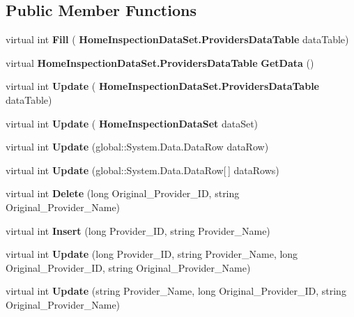 \subsection*{Public Member Functions}
\begin{DoxyCompactItemize}
\item 
\mbox{\label{class_a_f_h___scheduler_1_1_home_inspection_data_set_table_adapters_1_1_providers_table_adapter_a92208d2347cf62d525bd9ffa95bc9fef}} 
virtual int {\bfseries Fill} (\textbf{ Home\+Inspection\+Data\+Set.\+Providers\+Data\+Table} data\+Table)
\item 
\mbox{\label{class_a_f_h___scheduler_1_1_home_inspection_data_set_table_adapters_1_1_providers_table_adapter_a80451c14243a921bb45ecad94e3ed131}} 
virtual \textbf{ Home\+Inspection\+Data\+Set.\+Providers\+Data\+Table} {\bfseries Get\+Data} ()
\item 
\mbox{\label{class_a_f_h___scheduler_1_1_home_inspection_data_set_table_adapters_1_1_providers_table_adapter_a5c0a17c73d0325840a2fe51e9cb7bcc0}} 
virtual int {\bfseries Update} (\textbf{ Home\+Inspection\+Data\+Set.\+Providers\+Data\+Table} data\+Table)
\item 
\mbox{\label{class_a_f_h___scheduler_1_1_home_inspection_data_set_table_adapters_1_1_providers_table_adapter_aa90d6d8334f247b26bc364e035e8ef66}} 
virtual int {\bfseries Update} (\textbf{ Home\+Inspection\+Data\+Set} data\+Set)
\item 
\mbox{\label{class_a_f_h___scheduler_1_1_home_inspection_data_set_table_adapters_1_1_providers_table_adapter_ab7cb60f81149e91bfb08b084691c5a29}} 
virtual int {\bfseries Update} (global\+::\+System.\+Data.\+Data\+Row data\+Row)
\item 
\mbox{\label{class_a_f_h___scheduler_1_1_home_inspection_data_set_table_adapters_1_1_providers_table_adapter_a797e345a636651251acdce086f9348a2}} 
virtual int {\bfseries Update} (global\+::\+System.\+Data.\+Data\+Row[$\,$] data\+Rows)
\item 
\mbox{\label{class_a_f_h___scheduler_1_1_home_inspection_data_set_table_adapters_1_1_providers_table_adapter_a65fa9e63d6839c82005fec79e00a52f4}} 
virtual int {\bfseries Delete} (long Original\+\_\+\+Provider\+\_\+\+ID, string Original\+\_\+\+Provider\+\_\+\+Name)
\item 
\mbox{\label{class_a_f_h___scheduler_1_1_home_inspection_data_set_table_adapters_1_1_providers_table_adapter_a36deda5c507fb8af810a9986c277207a}} 
virtual int {\bfseries Insert} (long Provider\+\_\+\+ID, string Provider\+\_\+\+Name)
\item 
\mbox{\label{class_a_f_h___scheduler_1_1_home_inspection_data_set_table_adapters_1_1_providers_table_adapter_a92d82e680d36af0c6b3b344a863d5caf}} 
virtual int {\bfseries Update} (long Provider\+\_\+\+ID, string Provider\+\_\+\+Name, long Original\+\_\+\+Provider\+\_\+\+ID, string Original\+\_\+\+Provider\+\_\+\+Name)
\item 
\mbox{\label{class_a_f_h___scheduler_1_1_home_inspection_data_set_table_adapters_1_1_providers_table_adapter_aad00140ee0be945c8c4e82507f878265}} 
virtual int {\bfseries Update} (string Provider\+\_\+\+Name, long Original\+\_\+\+Provider\+\_\+\+ID, string Original\+\_\+\+Provider\+\_\+\+Name)
\end{DoxyCompactItemize}
